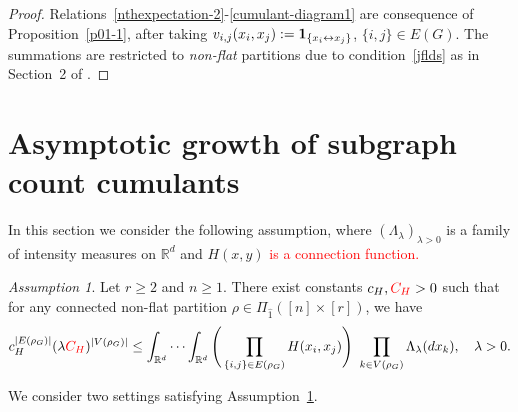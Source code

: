\documentclass[bj,authoryear,noshowframe]{imsart}
\theoremstyle{plain}
\theoremstyle{remark}
\newcommand{\R}{\mathbb{R}}
\newcommand{\bone}{{\bf 1}}
\def\real{{\mathord{\mathbb R}}}
\newtheorem{assumption}{Assumption}[section]
\begin{document}
\begin{proof}
 Relations~\eqref{nthexpectation-2}-\eqref{cumulant-diagram1}
 are consequence of Proposition~\ref{p01-1}, after taking
  $v_{i,j}(x_i,x_j):=\bone_{\{x_i\leftrightarrow x_j\}}$,
  $\{i,j\}\in E(G)$.
  The summations are restricted to {\em non-flat} partitions
  due to condition~\eqref{jflds} as in Section~2 of \cite{prkhp}. 
\end{proof}
\section{Asymptotic growth of subgraph count cumulants}
\label{s6}
\noindent 
In this section we consider the following assumption,
where $(\Lambda_\lambda)_{\lambda >0}$ is a family 
of intensity measures on $\real^d$ and $H(x,y)$ \textcolor{red}{is
 a connection function.}
\begin{assumption}
\label{a61} 
 Let $r\geq 2$ and $n \geq 1$.
 There exist constants $c_H, \textcolor{red}{C_H} > 0$
 such that 
 for any connected non-flat partition 
 $\rho \in \Pi_{\widehat{1}} ( [n] \times [r])$, we have 
\begin{equation}
\label{integ-connecting3}
  c_H^{|E(\rho_G)|} ( \lambda \textcolor{red}{C_H} )^{|V(\rho_G)|}
\leq     \int_{\R^d}\cdots\int_{\R^d}
\Bigg(
\prod_{\{i,j\}\in E(\rho_G) }H(x_i,x_j)
\Bigg)
\
\prod_{k\in V(\rho_G) } \Lambda_\lambda (dx_k),
\quad \lambda >0. 
\end{equation}
\end{assumption}
 We consider two settings satisfying Assumption~\ref{a61}.
\end{document}
